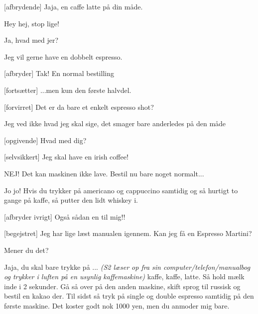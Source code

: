 \documentclass[a4paper,11pt]{article}
\begin{document}
\begin{sketch}
[afbrydende] Jaja, en caffe latte på din måde.


 Hey hej, stop lige!


 Ja, hvad med jer?


 Jeg vil gerne have en dobbelt espresso.

[afbryder] Tak! En normal bestilling

[fortsætter] ...men kun den første halvdel.

[forvirret] Det er da bare et enkelt espresso shot?

 Jeg ved ikke hvad jeg skal sige, det smager bare anderledes på den måde


[opgivende] Hvad med dig? 

[selvsikkert] Jeg skal have en irish coffee!


 NEJ! Det kan maskinen ikke lave. Bestil nu bare noget normalt...

 Jo jo! Hvis du trykker på americano og cappuccino samtidig og så hurtigt to gange på kaffe, så putter den lidt whiskey i.

[afbryder ivrigt] Også sådan en til mig!!


[begejstret] Jeg har lige læst manualen igennem. Kan jeg få en Espresso Martini? 

 Mener du det?

 Jaja, du skal bare trykke på ... \textit{(S2 læser op fra sin computer/telefon/manualbog og trykker i luften på en usynlig kaffemaskine)} kaffe, kaffe, latte. Så hold mælk inde i 2 sekunder. Gå så over på den anden maskine, skift sprog til russisk og bestil en kakao der. Til sidst så tryk på single og double espresso samtidig på den første maskine. Det koster godt nok 1000 yen, men du anmoder mig bare.



\end{sketch}
\end{document}
